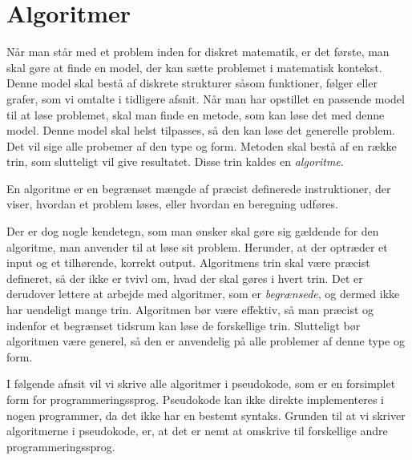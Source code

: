 \chapter{Algoritmer} \label{kap.algo}
Når man står med et problem inden for diskret matematik, er det første, man skal gøre at finde en model, der kan sætte problemet i matematisk kontekst. Denne model skal bestå af diskrete strukturer såsom funktioner, følger eller grafer, som vi omtalte i tidligere afsnit. Når man har opstillet en passende model til at løse problemet, skal man finde en metode, som kan løse det med denne model. Denne model skal helst tilpasses, så den kan løse det generelle problem. Det vil sige alle probemer af den type og form. Metoden skal bestå af en række trin, som slutteligt vil give resultatet. Disse trin kaldes en \emph{algoritme}. 
\begin{defn}
[Algoritmer] En algoritme er en begrænset mængde af præcist definerede instruktioner, der viser, hvordan et problem løses, eller hvordan en beregning udføres. 
\end{defn}

Der er dog nogle kendetegn, som man ønsker skal gøre sig gældende for den algoritme, man anvender til at løse sit problem. Herunder, at der optræder et input og et tilhørende, korrekt output. Algoritmens trin skal være præcist defineret, så der ikke er tvivl om, hvad der skal gøres i hvert trin. Det er derudover lettere at arbejde med algoritmer, som er \emph{begrænsede}, og dermed ikke har uendeligt mange trin. Algoritmen bør være effektiv, så man præcist og indenfor et begrænset tidsrum kan løse de forskellige trin. Slutteligt bør algoritmen være generel, så den er anvendelig på alle problemer af denne type og form.

I følgende afnsit vil vi skrive alle algoritmer i pseudokode, som er en forsimplet form for programmeringssprog. Pseudokode kan ikke direkte implementeres i nogen programmer, da det ikke har en bestemt syntaks. Grunden til at vi skriver algoritmerne i pseudokode, er, at det er nemt at omskrive til forskellige andre programmeringssprog.






